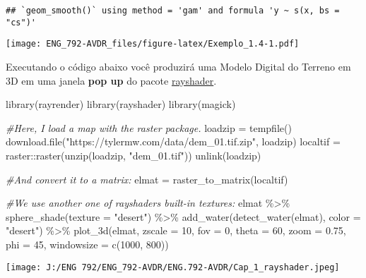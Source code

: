 \documentclass[
]{book}
\newenvironment{Shaded}{\begin{snugshade}}{\end{snugshade}}
\newcommand{\AttributeTok}[1]{\textcolor[rgb]{0.77,0.63,0.00}{#1}}
\newcommand{\CommentTok}[1]{\textcolor[rgb]{0.56,0.35,0.01}{\textit{#1}}}
\newcommand{\DecValTok}[1]{\textcolor[rgb]{0.00,0.00,0.81}{#1}}
\newcommand{\FloatTok}[1]{\textcolor[rgb]{0.00,0.00,0.81}{#1}}
\newcommand{\FunctionTok}[1]{\textcolor[rgb]{0.00,0.00,0.00}{#1}}
\newcommand{\NormalTok}[1]{#1}
\newcommand{\OtherTok}[1]{\textcolor[rgb]{0.56,0.35,0.01}{#1}}
\newcommand{\SpecialCharTok}[1]{\textcolor[rgb]{0.00,0.00,0.00}{#1}}
\newcommand{\StringTok}[1]{\textcolor[rgb]{0.31,0.60,0.02}{#1}}
\begin{document}
\begin{verbatim}
## `geom_smooth()` using method = 'gam' and formula 'y ~ s(x, bs = "cs")'
\end{verbatim}

\texttt{[image: ENG\_792-AVDR\_files/figure-latex/Exemplo\_1.4-1.pdf]}

Executando o código abaixo você produzirá uma Modelo Digital do Terreno em 3D em uma janela \textbf{pop up} do pacote \href{https://www.rayshader.com/}{rayshader}.

\begin{Shaded}
\begin{Highlighting}[]
\FunctionTok{library}\NormalTok{(rayrender)}
\FunctionTok{library}\NormalTok{(rayshader)}
\FunctionTok{library}\NormalTok{(magick)}

\CommentTok{\#Here, I load a map with the raster package.}
\NormalTok{loadzip }\OtherTok{=} \FunctionTok{tempfile}\NormalTok{() }
\FunctionTok{download.file}\NormalTok{(}\StringTok{"https://tylermw.com/data/dem\_01.tif.zip"}\NormalTok{, loadzip)}
\NormalTok{localtif }\OtherTok{=}\NormalTok{ raster}\SpecialCharTok{::}\FunctionTok{raster}\NormalTok{(}\FunctionTok{unzip}\NormalTok{(loadzip, }\StringTok{"dem\_01.tif"}\NormalTok{))}
\FunctionTok{unlink}\NormalTok{(loadzip)}

\CommentTok{\#And convert it to a matrix:}
\NormalTok{elmat }\OtherTok{=} \FunctionTok{raster\_to\_matrix}\NormalTok{(localtif)}

\CommentTok{\#We use another one of rayshader\textquotesingle{}s built{-}in textures:}
\NormalTok{elmat }\SpecialCharTok{\%\textgreater{}\%}
  \FunctionTok{sphere\_shade}\NormalTok{(}\AttributeTok{texture =} \StringTok{"desert"}\NormalTok{) }\SpecialCharTok{\%\textgreater{}\%}
  \FunctionTok{add\_water}\NormalTok{(}\FunctionTok{detect\_water}\NormalTok{(elmat), }\AttributeTok{color =} \StringTok{"desert"}\NormalTok{) }\SpecialCharTok{\%\textgreater{}\%}
  \FunctionTok{plot\_3d}\NormalTok{(elmat, }\AttributeTok{zscale =} \DecValTok{10}\NormalTok{, }\AttributeTok{fov =} \DecValTok{0}\NormalTok{, }\AttributeTok{theta =} \DecValTok{60}\NormalTok{, }\AttributeTok{zoom =} \FloatTok{0.75}\NormalTok{, }\AttributeTok{phi =} \DecValTok{45}\NormalTok{, }\AttributeTok{windowsize =} \FunctionTok{c}\NormalTok{(}\DecValTok{1000}\NormalTok{, }\DecValTok{800}\NormalTok{))}
\end{Highlighting}
\end{Shaded}

\texttt{[image: J:/ENG 792/ENG\_792-AVDR/ENG.792-AVDR/Cap\_1\_rayshader.jpeg]}
\end{document}
